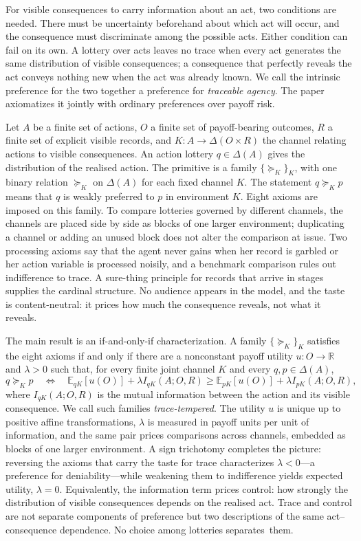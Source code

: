 \documentclass[11pt,a4paper]{article}
\theoremstyle{definition}
\newcommand{\E}{\mathbb E}
\newcommand{\1}{\mathbf 1}
\begin{document}
For visible consequences to carry information about an act, two conditions are needed.  There must be uncertainty
beforehand about which act will occur, and the consequence must discriminate among the
possible acts.  Either condition can fail on its own.  A lottery over acts leaves no trace when every act generates
the same distribution of visible consequences; a consequence that perfectly reveals the act conveys
nothing new when the act was already known.  We call the intrinsic preference for the two together a preference for \emph{traceable agency}.  The paper axiomatizes it jointly with ordinary
preferences over payoff risk.

Let $A$ be a finite set of actions, $O$ a finite set of payoff-bearing
outcomes, $R$ a finite set of explicit visible records, and $K:A\to\Delta(O\times R)$ the channel relating actions to
visible consequences.  An action lottery $q\in\Delta(A)$ gives the distribution of the realised action.  The primitive is a family
$\{\succeq_K\}_K$, with one binary relation $\succeq_K$ on $\Delta(A)$ for each fixed channel $K$.
The statement $q\succeq_Kp$ means that $q$ is weakly preferred to $p$ in environment $K$.  Eight axioms are
imposed on this family.  To compare lotteries governed
by different channels, the channels are placed side by side as blocks of one larger environment; duplicating a
channel or adding an unused block does not alter the comparison at issue.  Two processing axioms say that the agent never gains when her record is garbled or her action variable is processed noisily, and a benchmark comparison rules out indifference to trace. A sure-thing principle for records that arrive in stages supplies
the cardinal structure.  No audience appears in the model, and the
taste is content-neutral: it prices how much the consequence reveals, not what it reveals.

The main result is an if-and-only-if characterization.  A family $\{\succeq_K\}_K$ satisfies the eight axioms if and
only if there are a nonconstant payoff utility $u:O\to\mathbb R$ and $\lambda>0$ such that, for every finite joint
channel $K$ and every $q,p\in\Delta(A)$,
\[
 q\succeq_Kp
 \quad\Longleftrightarrow\quad
 \E_{qK}[u(O)]+\lambda I_{qK}(A;O,R)
 \ge
 \E_{pK}[u(O)]+\lambda I_{pK}(A;O,R),
\]
where $I_{qK}(A;O,R)$ is the mutual information between the action and its visible consequence.  We call such
families \emph{trace-tempered}.  The utility $u$ is unique up to positive affine transformations, $\lambda$ is
measured in payoff units per unit of information, and the same pair prices comparisons across channels, embedded
as blocks of one larger environment.  A sign trichotomy completes the picture: reversing the axioms that carry the
taste for trace characterizes $\lambda<0$---a preference for deniability---while weakening them to indifference
yields expected utility, $\lambda=0$. Equivalently, the information term prices control: how strongly the distribution of visible consequences depends on the realised act. Trace and control are not separate components of preference but two descriptions of the same act–consequence dependence. No choice among lotteries separates~them.
\end{document}

